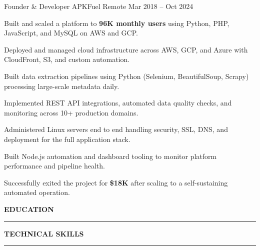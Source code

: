 \documentclass[11pt, a4paper]{awesome-cv}
\renewcommand{\acvSectionTopSkip}{2mm}
\renewcommand{\acvSectionContentTopSkip}{1.5mm}
\renewcommand{\cvsection}[1]{%
  \vspace{\acvSectionTopSkip}
  \phantomsection{}
  {\fontsize{16pt}{1em}\bodyfont\bfseries\color{sectioncolor}\MakeUppercase{#1}}\\[-2mm]
  {\color{sectioncolor}\hrule}
  \vspace{\acvSectionContentTopSkip}
}
\begin{document}
\begin{cventries}
  \cventry
    {Founder \& Developer}
    {APKFuel}
    {Remote}
    {Mar 2018 -- Oct 2024}
    {
      \begin{cvitems}
        \item {Built and scaled a platform to \textbf{96K monthly users} using Python, PHP, JavaScript, and MySQL on AWS and GCP.}
        \item {Deployed and managed cloud infrastructure across AWS, GCP, and Azure with CloudFront, S3, and custom automation.}
        \item {Built data extraction pipelines using Python (Selenium, BeautifulSoup, Scrapy) processing large-scale metadata daily.}
        \item {Implemented REST API integrations, automated data quality checks, and monitoring across 10+ production domains.}
        \item {Administered Linux servers end to end handling security, SSL, DNS, and deployment for the full application stack.}
        \item {Built Node.js automation and dashboard tooling to monitor platform performance and pipeline health.}
        \item {Successfully exited the project for \textbf{\$18K} after scaling to a self-sustaining automated operation.}
      \end{cvitems}
    }

\end{cventries}

\cvsection{Education}

\begin{cvskills}
\end{cvskills}

\cvsection{Technical Skills}
\end{document}
